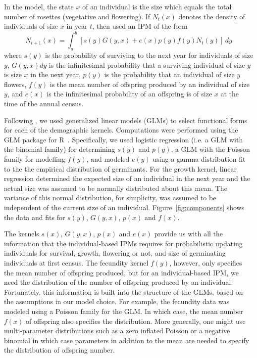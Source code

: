 \documentclass[12pt]{amsart}\usepackage[]{graphicx}\usepackage[]{color}
\begin{document}
In the model, the state $x$ of an individual is the size which equals the total number of rosettes (vegetative and flowering). If $N_t(x)$ denotes the density of individuals of size $x$ in year $t$, then \citet{salguero-etal-12} used an IPM of the form
\[
N_{t+1}(x)=\int_a^b \left[ s(y)G(y,x)+e(x)p(y)f(y)N_t(y)\right]\,dy
\]
where $s(y)$ is the probability of surviving to the next year for individuals of size $y$, $G(y,x)dy$ is the infinitesimal probability that a surviving individual of size $y$ is size $x$ in the next year, $p(y)$ is the probability that an individual of size $y$ flowers, $f(y)$ is the mean number of offspring produced by an individual of size $y$, and $e(x)$ is the infinitesimal probability of an offspring is of size $x$ at the time of the annual census.

Following \citet{salguero-etal-12}, we used generalized linear models (GLMs) to select functional forms for each of the demographic kernels. Computations were performed using the GLM package for R~\citep{R-15}. Specifically, we used logistic regression (i.e. a GLM with the binomial family) for determining $s(y)$ and $p(y)$, a GLM with the Poisson family for modelling $f(y)$, and modeled $e(y)$ using a gamma distribution fit to the the empirical distribution of germinants. For the growth kernel, linear regression determined the expected size of an individual in the next year and the actual size was assumed to be normally distributed about this mean. The variance of this normal distribution, for simplicity, was assumed to be independent of the current size of an individual. Figure~\ref{fig:components} shows the data and fits for $s(y)$, $G(y,x)$, $p(x)$ and $f(x)$.

The kernels $s(x)$, $G(y,x)$, $p(x)$ and $e(x)$ provide us with all the information that the individual-based IPMs requires for probabilistic updating individuals for survival, growth, flowering or not, and size of germinating individuals at first census. The fecundity kernel $f(y)$, however, only specifies the mean number of offspring produced, but for an individual-based IPM, we need the distribution of the number of offspring produced by an individual. Fortunately, this information is built into the structure of the GLMs, based on the assumptions in our model choice. For example, the fecundity data was modeled using a Poisson family for the GLM.  In which case, the mean number $f(x)$ of offspring also specifies the distribution. More generally, one might use multi-parameter distributions such as a zero inflated Poisson or a negative binomial in which case parameters in addition to the mean are needed to specify the distribution of offspring number.
\end{document}
